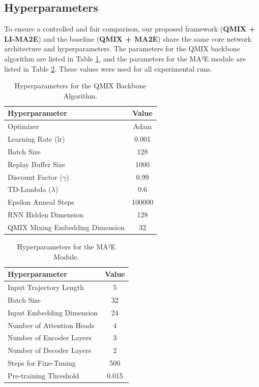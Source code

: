 \subsection{Hyperparameters}

To ensure a controlled and fair comparison, our proposed framework (\textbf{QMIX + LI-MA2E}) and the baseline (\textbf{QMIX + MA2E}) share the same core network architecture and hyperparameters. The parameters for the QMIX backbone algorithm are listed in Table \ref{tab:qmix_hyperparams}, and the parameters for the MA²E module are listed in Table \ref{tab:ma2e_hyperparams}. These values were used for all experimental runs.

\begin{table}[H]
\centering

\renewcommand{\arraystretch}{1.5} 
\begin{tabular}{lc} 
\hline
\textbf{Hyperparameter} & \textbf{Value} \\
\hline 
Optimizer & Adam \\
Learning Rate (lr) & 0.001 \\
Batch Size & 128 \\
Replay Buffer Size & 1000 \\
Discount Factor ($\gamma$) & 0.99 \\
TD-Lambda ($\lambda$) & 0.6 \\
Epsilon Anneal Steps & 100000 \\
RNN Hidden Dimension & 128 \\
QMIX Mixing Embedding Dimension & 32 \\
\hline
\end{tabular}
\caption{Hyperparameters for the QMIX Backbone Algorithm.}
\label{tab:qmix_hyperparams}
\end{table}

\begin{table}[H]
\centering

\renewcommand{\arraystretch}{1.5} 
\begin{tabular}{lc} 
\hline
\textbf{Hyperparameter} & \textbf{Value} \\
\hline 
Input Trajectory Length & 5 \\
Batch Size & 32 \\
Input Embedding Dimension & 24 \\
Number of Attention Heads & 4 \\
Number of Encoder Layers & 3 \\
Number of Decoder Layers & 2 \\
Steps for Fine-Tuning & 500 \\
Pre-training Threshold & 0.015 \\
\hline
\end{tabular}
\caption{Hyperparameters for the MA²E Module.}
\label{tab:ma2e_hyperparams}
\end{table}
